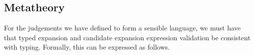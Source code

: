 




\subsection{Metatheory}
For the judgements we have defined to form a sensible language, we must have that typed expansion and candidate expansion expression validation be consistent with typing. Formally, this can be expressed as follows.

